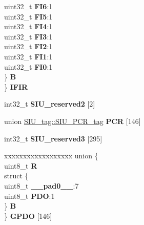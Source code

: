 \begin{DoxyCompactItemize}
\begin{tabbing}
\>\>uint32\_t {\bfseries FI6}:1\\
\>\>uint32\_t {\bfseries FI5}:1\\
\>\>uint32\_t {\bfseries FI4}:1\\
\>\>uint32\_t {\bfseries FI3}:1\\
\>\>uint32\_t {\bfseries FI2}:1\\
\>\>uint32\_t {\bfseries FI1}:1\\
\>\>uint32\_t {\bfseries FI0}:1\\
\>\} {\bfseries B}\\
\} {\bfseries IFIR}\\

\end{tabbing}\item 
\mbox{\label{structSIU__tag_a6970f768e5e792f246dfd287853c3ab0}} 
int32\+\_\+t {\bfseries S\+I\+U\+\_\+reserved2} \mbox{[}2\mbox{]}
\item 
\mbox{\label{structSIU__tag_a2c8750b1a18acb8399a74103d6db34af}} 
union \mbox{\hyperlink{unionSIU__tag_1_1SIU__PCR__tag}{S\+I\+U\+\_\+tag\+::\+S\+I\+U\+\_\+\+P\+C\+R\+\_\+tag}} {\bfseries P\+CR} \mbox{[}146\mbox{]}
\item 
\mbox{\label{structSIU__tag_a543054bcbfc3f9d6206dacfbb94c5da0}} 
int32\+\_\+t {\bfseries S\+I\+U\+\_\+reserved3} \mbox{[}295\mbox{]}
\item 
\mbox{\label{structSIU__tag_ab27661b30cfa6f21712e6fe4f76b1d48}} 
\begin{tabbing}
xx\=xx\=xx\=xx\=xx\=xx\=xx\=xx\=xx\=\kill
union \{\\
\>uint8\_t {\bfseries R}\\
\>struct \{\\
\>\>uint8\_t {\bfseries \_\_pad0\_\_}:7\\
\>\>uint8\_t {\bfseries PDO}:1\\
\>\} {\bfseries B}\\
\} {\bfseries GPDO} \mbox{[}146\mbox{]}\\


\end{tabbing}
\end{DoxyCompactItemize}
